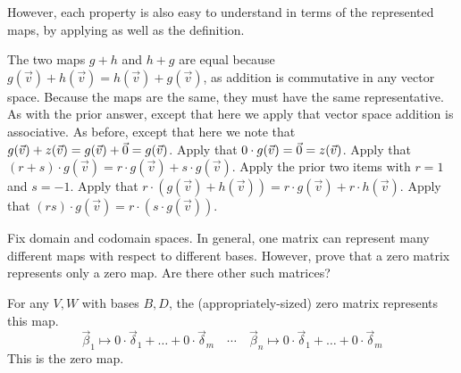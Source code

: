 \begin{exercises}
\begin{answer}
      However, each property
      is also easy to understand in terms of the represented
      maps, by applying  as well as
      the definition.
      \begin{exparts}
        \partsitem The two maps $g+h$ and $h+g$ are equal because
          $g(\vec{v})+h(\vec{v})=h(\vec{v})+g(\vec{v})$, as addition is 
          commutative in any vector space.
          Because the maps are the same, they must have the same
          representative. 
        \partsitem As with the prior answer, except that here we apply that
          vector space addition is associative.
        \partsitem As before, except that here we note that
          $g(\vec{v})+z(\vec{v})=g(\vec{v})+\vec{0}=g(\vec{v})$.
        \partsitem Apply that
          $0\cdot g(\vec{v})=\vec{0}=z(\vec{v})$.
        \partsitem Apply that
          $(r+s)\cdot g(\vec{v})=r\cdot g(\vec{v})+s\cdot g(\vec{v})$.
        \partsitem Apply the prior two items with $r=1$ and $s=-1$.
        \partsitem Apply that
          $r\cdot (g(\vec{v})+h(\vec{v}))=r\cdot g(\vec{v})+r\cdot h(\vec{v})$.
        \partsitem Apply that
          $(rs)\cdot g(\vec{v})=r\cdot(s\cdot g(\vec{v}))$.
      \end{exparts}
    \end{answer}
  \item 
    Fix domain and codomain spaces. 
    In general, one
    matrix can represent many different maps with respect to different bases.
    However, prove that a zero matrix represents only a zero map.
    Are there other such matrices?
    \begin{answer}
      For any \( V,W \) with bases \( B,D \), 
      the (appropriately-sized) zero matrix represents this map.
      \begin{equation*}
        \vec{\beta}_1\mapsto 0\cdot\vec{\delta}_1+\dots+0\cdot\vec{\delta}_m
        \quad\cdots\quad
        \vec{\beta}_n\mapsto 0\cdot\vec{\delta}_1+\dots+0\cdot\vec{\delta}_m
      \end{equation*}
      This is the zero map.


\end{answer}
\end{exercises}
